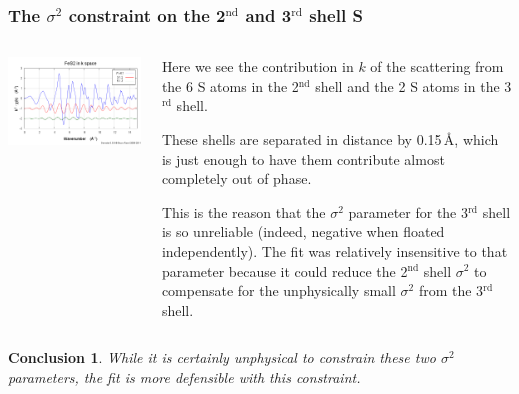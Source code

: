 \documentclass[10pt, xcolor=x11names, compress, handout]{beamer}
\newtheorem{conclusion}[theorem]{Conclusion}
\begin{document}
\begin{frame}
  \frametitle{The $\sigma^2$ constraint on the 2$^{\mathrm{nd}}$ and
    3$^{\mathrm{rd}}$ shell S}
  \begin{columns}
    \begin{column}{0.5\linewidth}
      \includegraphics[width=\linewidth]{images/s2s3.png}      
    \end{column}
    \begin{column}{0.5\linewidth}
      \footnotesize%
      Here we see the contribution in $k$ of the scattering from the 6
      S atoms in the 2$^{\mathrm{nd}}$ shell and the 2 S atoms in the
      3$^{\mathrm{rd}}$ shell.

      \medskip

      These shells are separated in distance by 0.15\,\AA, which is
      just enough to have them contribute almost completely out of
      phase.

      \medskip

      This is the reason that the $\sigma^2$ parameter for the
      3$^{\mathrm{rd}}$ shell is so unreliable (indeed, negative when
      floated independently).  The fit was
      relatively insensitive to that parameter because it could reduce
      the 2$^{\mathrm{nd}}$ shell $\sigma^2$ to compensate for the
      unphysically small $\sigma^2$ from the 3$^{\mathrm{rd}}$ shell.
    \end{column}
  \end{columns}

  \begin{conclusion}
    While it is certainly unphysical to constrain these two $\sigma^2$
    parameters, the fit is more defensible with this constraint.
  \end{conclusion}
\end{frame}
\end{document}
